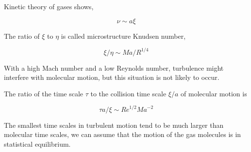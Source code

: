 \documentclass{article}
\begin{document}
Kinetic theory of gases shows,

\begin{equation*}
    \nu\sim a\xi
\end{equation*}

The ratio of $\xi$ to $\eta$ is called microstructure Knudsen number,

\begin{equation*}
    \xi/\eta\sim Ma/R^{1/4}
\end{equation*}

With a high Mach number and a low Reynolds number, turbulence might interfere with molecular motion, but this situation is not likely to occur.

The ratio of the time scale $\tau$ to the collision time scale $\xi/a$ of molecular motion is

\begin{equation*}
    \tau a/\xi\sim Re^{1/2}Ma^{-2}
\end{equation*}

The smallest time scales in turbulent motion tend to be much larger than molecular time scales, we can assume that the motion of the gas molecules is in statistical equilibrium.

\ifx\allfiles\undefined         %
\end{document}
